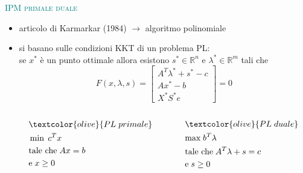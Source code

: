 
\begin{frame}[t]{\textcolor{teal}{\textsc{\LARGE IPM primale duale}}}
	\begin{itemize}
		\item articolo di Karmarkar (1984) %
		$\rightarrow$ algoritmo polinomiale
		\item si basano sulle condizioni KKT di un problema PL:\\ se $x^{*}$ è un punto ottimale allora esistono $s^{*}\in\mathbb{R}^{n}$ e $\lambda^{*}\in\mathbb{R}^{m}$ tali che
		\begin{equation*}
		\mathit{F}(x,\lambda,s)= \begin{bmatrix}
		A^{T}\lambda^{*}+s^{*}-c \\Ax^{*}-b \\X^{*}S^{*}e
		\end{bmatrix}=0
		\end{equation*}
		\pause
		\begin{columns}
		\begin{column}{0.4\textwidth}
		\begin{equation*}
		\begin{split}
		&\textcolor{olive}{PL\; primale}\\
		&\min\;c^{T}x\\
		&\text{tale che\;}Ax= b\;\\&\text{e\;}x\geq0
		\end{split}
		\end{equation*}	
		\end{column}
		\begin{column}{0.4\textwidth}
		\begin{equation*}
		\begin{split}
		&\textcolor{olive}{PL\; duale}\\
		&\text{max\;}b^{T}\lambda\\
		&\text{tale che\;}A^{T}\lambda+s=c\\ &\text{e\;} s\geq0
		\end{split}
		\end{equation*}	
		\end{column}		
		\end{columns}
	\end{itemize}
\end{frame}


